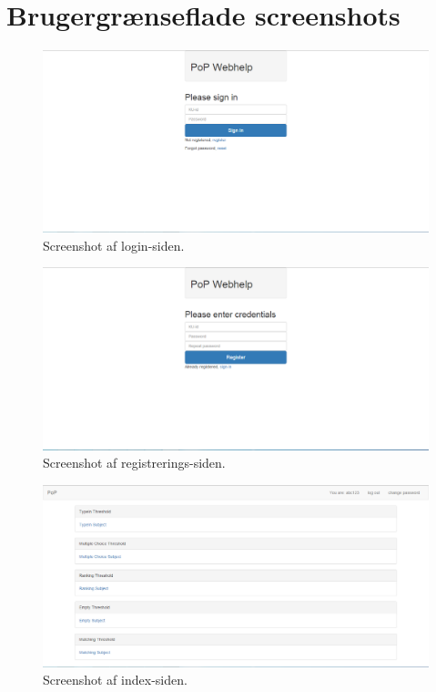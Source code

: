 \documentclass[11pt, a4paper]{article}
\begin{document}
\section{Brugergrænseflade screenshots}
\label{sec:screenshots}
\begin{figure}[h!]
    \centering
    \includegraphics[width=1\linewidth]{figures/interface/login.png}
    \caption{Screenshot af login-siden.}
    \label{fig:screenshot_login}
\end{figure}


\begin{figure}[h!]
    \centering
    \includegraphics[width=1\linewidth]{figures/interface/register.png}
    \caption{Screenshot af registrerings-siden.}
    \label{fig:screenshot_register}
\end{figure}


\begin{figure}[h!]
    \centering
    \includegraphics[width=1\linewidth]{figures/interface/overview.png}
    \caption{Screenshot af index-siden.}
    \label{fig:screenshot_overview}
\end{figure}
\end{document}

